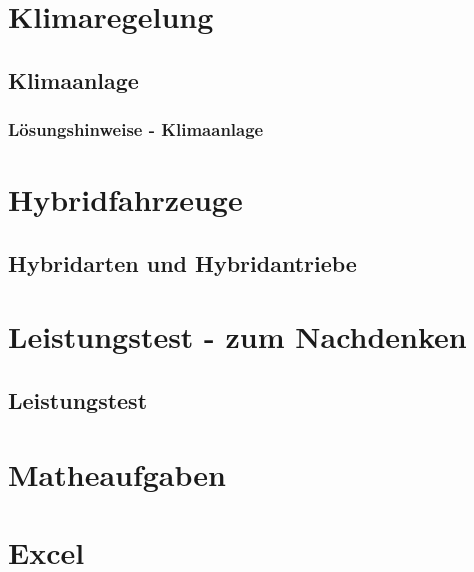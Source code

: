 \part{Klimaregelung}
\chapter{Klimaanlage}
  \newpage
\section{Lösungshinweise - Klimaanlage}
 \newpage



\part{Hybridfahrzeuge}
\chapter{Hybridarten und Hybridantriebe}
 \newpage

\part{Leistungstest - zum Nachdenken}
\chapter{Leistungstest}


\part{Matheaufgaben}
 \newpage
 \newpage



\part{Excel}%
 \newpage

